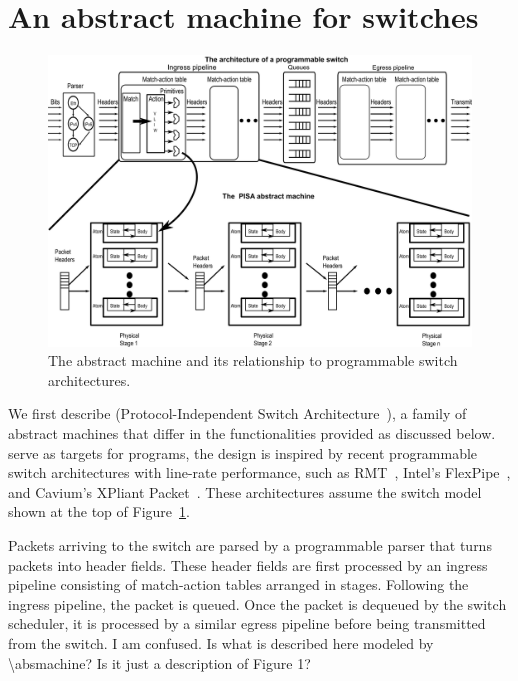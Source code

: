 \section{An abstract machine for switches}
\label{s:absmachine}

\begin{figure}[!t]
  \includegraphics[width=\textwidth]{pisa.pdf}
  \caption{The \absmachine abstract machine and its relationship to
  programmable switch architectures.}
  \label{fig:switch}
\end{figure}

We first describe \absmachine (Protocol-Independent Switch Architecture~\cite{nick_p4}), 
a family of abstract machines that differ in the functionalities provided 
as discussed below. \absmachine serve as targets for \pktlanguage programs, 
the design is inspired by recent programmable switch architectures with
line-rate performance, such as RMT~\cite{rmt}, Intel's
FlexPipe~\cite{flexpipe}, and Cavium's XPliant Packet~\cite{xpliant}. 
These architectures assume the switch model shown at the top of Figure~\ref{fig:switch}.

Packets arriving to the switch are parsed by a programmable parser that turns
packets into header fields. These header fields are first processed by an
ingress pipeline consisting of match-action tables arranged in stages.
Following the ingress pipeline, the packet is queued. Once the packet is
dequeued by the switch scheduler, it is processed by a similar egress pipeline
before being transmitted from the switch. \ac{I am confused. Is what is described
here modeled by \absmachine? Is it just a description of Figure 1?}

